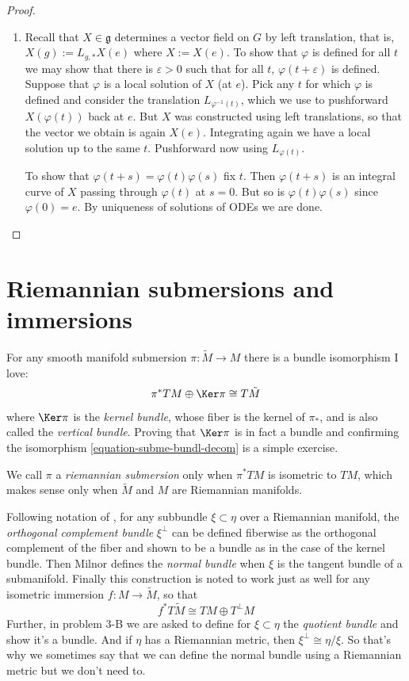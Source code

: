 \documentclass{book}
\begin{document}
\begin{proof}
\begin{enumerate}
\item Recall that $X \in \mathfrak{g}$
determines a vector field on $G$
by left translation, that is,
$X(g):=L_{g,*}X(e)$ where $X:=X(e)$.
To show that $\varphi$ is defined for all $t$
we may show that there is $\varepsilon>0$
such that for all $t$,
$\varphi(t+\varepsilon)$ is defined.
Suppose that $\varphi$ is a local solution of
$X$ (at $e$).
Pick any $t$ for which $\varphi$ is defined
and consider the translation
$L_{\varphi^{-1}(t)}$, which we use to
pushforward $X(\varphi(t))$
back at $e$.
But $X$ was constructed using left
translations,
so that the vector we obtain is again $X(e)$.
Integrating again we have a local solution up
to the same $t$.
Pushforward now using $L_{\varphi(t)}$.

To show that
$\varphi(t+s)=\varphi(t)\varphi(s)$
fix $t$. Then $\varphi(t+s)$ is an integral
curve of $X$
passing through $\varphi(t)$ at $s=0$.
But so is $\varphi(t)\varphi(s)$ since
$\varphi(0)=e$.
By uniqueness of solutions of ODEs we are
done.
\end{enumerate}
\end{proof}


\section{Riemannian submersions and
immersions}
\label{section-riema-subme-immer}

For any smooth manifold submersion
$\pi:\tilde{M}\to M$ there is a bundle
isomorphism I love:
\begin{equation}
\label{equation-subme-bundl-decom}
\pi^*TM \oplus \Ker \pi\cong
T\tilde{M} \end{equation}
 where $\Ker\pi$ is the {\it kernel bundle},
 whose
fiber is the kernel of $\pi_*$, and is also
called the {\it vertical bundle}.
Proving that $\Ker\pi$ is in fact a bundle
and confirming the isomorphism
\ref{equation-subme-bundl-decom} is a simple
exercise.

We call $\pi$ a {\it riemannian submersion}
only when $\pi^*TM$ is isometric to
$TM$, which makes sense only when $\tilde{M}$
and $M$ are Riemannian manifolds.

Following notation of
\cite{Milnor-Characteristic-Classes}, for any
subbundle
$\xi \subset\eta$ over a Riemannian manifold,
the {\it orthogonal complement
bundle} $\xi^\perp$ can be defined fiberwise
as the orthogonal complement of the
fiber and shown to be a bundle as in the case
of the kernel bundle. Then Milnor
defines the {\it normal bundle} when $\xi$ is
the tangent bundle of a
submanifold. Finally this construction is
noted to work just as well for any
isometric immersion $f:M\to \tilde{M}$, so
that
\begin{equation}
\label{equation-immer-bundl-decom}
f^*T\tilde{M}\cong TM\oplus T^\perp M
\end{equation}
Further, in problem 3-B we are asked to
define for $\xi \subset \eta$ the {\it
quotient bundle} and show it's a bundle. And
if $\eta$ has a Riemannian metric,
then $\xi^\perp\cong\eta/\xi$. So that's why
we sometimes say that we can define
the normal bundle using a Riemannian metric
but we don't need to.
\end{document}
